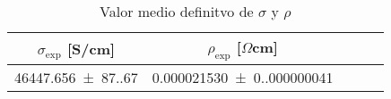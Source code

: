 \begin{table}[H]
    \centering
\begin{tabular}{ccccc}
\toprule
$\sigma_{\exp}$ [S/cm] & $\rho_{\exp}$ [$\Omega$cm] \\
\midrule
\num{46447.656(87.670)} & \num{0.000021530(0.000000041)} \\
\bottomrule
\end{tabular}
    \caption{Valor medio definitvo de $\sigma$ y $\rho $}
    \label{Tab:S5}
\end{table}
